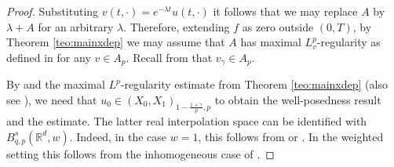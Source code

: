 \documentclass{amsart}
\theoremstyle{plain}
\theoremstyle{remark}
\theoremstyle{plain}
\numberwithin{equation}{section}
\begin{document}
\begin{proof}
Substituting $v(t,\cdot) = e^{-\lambda t} u(t,\cdot)$ it follows that we may replace $A$ by $\lambda+A$ for an arbitrary $\lambda$. Therefore, extending $f$ as zero outside $(0,T)$, by Theorem \ref{teo:mainxdep} we may assume that $A$ has maximal $L^p_v$-regularity as defined in \cite[Definition 4.11]{GV} for any $v\in A_p$.  Recall from \cite[Example 9.1.7]{GrafakosModern} that $v_{\gamma}\in A_p$.

By \cite{PS04} and the maximal $L^p$-regularity estimate from Theorem \ref{teo:mainxdep} (also see \cite[Section 4.4]{GV}), we need that $u_0\in (X_0, X_1)_{1-\frac{1+\gamma}{p},p}$ to obtain the well-posedness result and the estimate. The latter real interpolation space can be identified with $B^{s}_{q,p}({ \mathbb{R} }^d,w)$. Indeed, in the case $w=1$, this follows from \cite[Theorem 6.2.4]{BergLof} or \cite[Remark 2.4.2.4]{Tr1}. In the weighted setting this follows from the inhomogeneous case of \cite[Theorem 3.5]{Bui82}.
\end{proof}
\end{document}
